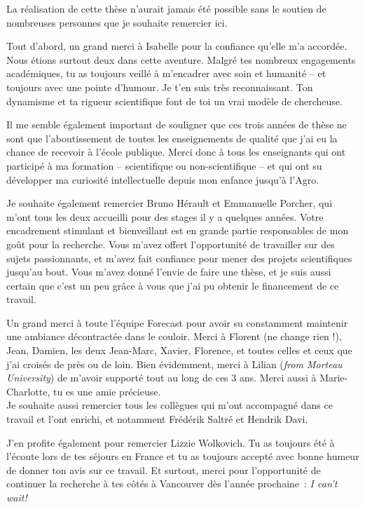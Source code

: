 {
\small

La réalisation de cette thèse n’aurait jamais été possible sans le soutien de nombreuses personnes que je souhaite remercier ici.

Tout d'abord, un grand merci à Isabelle pour la confiance qu'elle m'a accordée. Nous étions surtout deux dans cette aventure. Malgré tes nombreux engagements académiques, tu as toujours veillé à m'encadrer avec soin et humanité -- et toujours avec une pointe d'humour. Je t'en suis très reconnaissant. Ton dynamisme et ta rigueur scientifique font de toi un vrai modèle de chercheuse. 

Il me semble également important de souligner que ces trois années de thèse ne sont que l'aboutissement de toutes les enseignements de qualité que j'ai eu la chance de recevoir à l'école publique.
Merci donc à tous les enseignants qui ont participé à ma formation -- scientifique ou non-scientifique -- et qui ont su développer ma curiosité intellectuelle depuis mon enfance jusqu'à l'Agro.

Je souhaite également remercier Bruno Hérault et Emmanuelle Porcher, qui m'ont tous les deux accueilli pour des stages il y a quelques années. Votre encadrement stimulant et bienveillant est en grande partie responsables de mon goût pour la recherche. Vous m'avez offert l'opportunité de travailler sur des sujets passionnants, et m'avez fait confiance pour mener des projets scientifiques jusqu'au bout.
Vous m'avez donné l'envie de faire une thèse, et je suis aussi certain que c'est un peu grâce à vous que j'ai pu obtenir le financement de ce travail.

Un grand merci à toute l'équipe Forecast pour avoir su constamment maintenir une ambiance décontractée dans le couloir. Merci à Florent (ne change rien !), Jean, Damien, les deux Jean-Marc, Xavier, Florence, et toutes celles et ceux que j'ai croisés de près ou de loin. Bien évidemment, merci à Lilian (\emph{from Morteau University}) de m'avoir supporté tout au long de ces 3 ans. Merci aussi à Marie-Charlotte, tu es une amie précieuse.\\
Je souhaite aussi remercier tous les collègues qui m'ont accompagné dans ce travail et l'ont enrichi, et notamment Frédérik Saltré et Hendrik Davi. 

J'en profite également pour remercier Lizzie Wolkovich. Tu as toujours été à l'écoute lors de tes séjours en France et tu as toujours accepté avec bonne humeur de donner ton avis sur ce travail. Et surtout, merci pour l'opportunité de continuer la recherche à tes côtés à Vancouver dès l'année prochaine~: \emph{I can't wait!}

}
